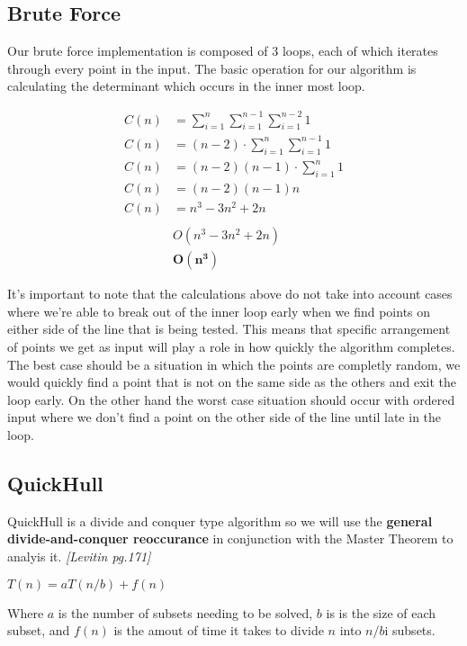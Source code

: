 \documentclass[a4paper, 12pt]{article}
\begin{document}
{  \subsection{Brute Force}
  Our brute force implementation is composed of 3 loops, each of which iterates through every point in the input. The basic operation for our algorithm is calculating the determinant which occurs in the inner most loop.
  \begin{center}
    \begin{align*}
      C(n) &= \sum\limits_{i=1}^n \sum\limits_{i=1}^{n-1} \sum\limits_{i=1}^{n-2} 1 \\
      C(n) &= (n-2) \cdot \sum\limits_{i=1}^n \sum\limits_{i=1}^{n-1}1 \\ 
      C(n) &= (n-2)(n-1) \cdot \sum\limits_{i=1}^n 1 \\
      C(n) &= (n-2)(n-1)n \\
      C(n) &= n^3 - 3n^2 + 2n \\ \\
           &O(n^3 -3n^2 +2n) \\
           &\bm{O(n^3)}
    \end{align*}
  \end{center}
It's important to note that the calculations above do not take into account cases where we're able to break out of the inner loop early when we find points on either side of the line that is being tested.  This means that specific arrangement of points we get as input will play a role in how quickly the algorithm completes.  The best case should be a situation in which the points are completly random, we would quickly find a point that is not on the same side as the others and exit the loop early.  On the other hand the worst case situation should occur with ordered input where we don't find a point on the other side of the line until late in the loop.
  \subsection{QuickHull}
  QuickHull is a divide and conquer type algorithm so we will use the \textbf{general divide-and-conquer reoccurance} in conjunction with the Master Theorem to analyis it. \textit{[Levitin pg.171]}

  \begin{center}
    $T(n) = aT(n/b) + f(n)$
  \end{center}

  Where $a$ is the number of subsets needing to be solved, $b$ is is the size of each subset, and $f(n)$ is the amout of time it takes to divide $n$ into $n/b$i subsets. \\ \\

}
\end{document}
